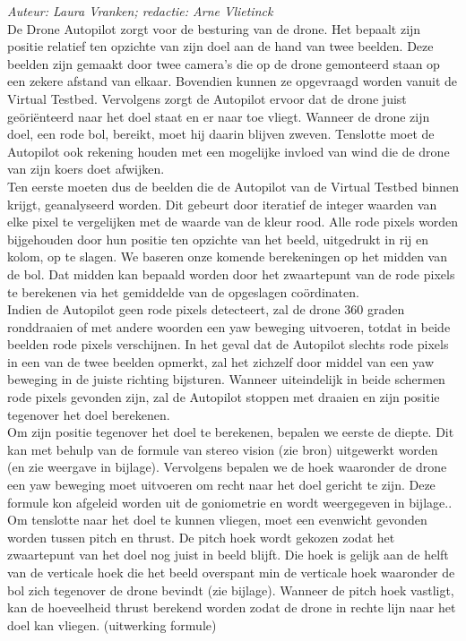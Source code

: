 {\em Auteur: Laura Vranken; redactie: Arne Vlietinck}\\

De Drone Autopilot zorgt voor de besturing van de drone. Het bepaalt zijn positie relatief ten opzichte van zijn doel aan de hand van twee beelden. Deze beelden zijn gemaakt door twee camera's die op de drone gemonteerd staan op een zekere afstand van elkaar. Bovendien kunnen ze opgevraagd worden vanuit de Virtual Testbed. Vervolgens zorgt de Autopilot ervoor dat de drone juist ge\"ori\"enteerd naar het doel staat en er naar toe vliegt. Wanneer de drone zijn doel,  een rode bol, bereikt, moet hij daarin blijven zweven. Tenslotte moet de Autopilot ook rekening houden met een mogelijke invloed van wind die de drone van zijn koers doet afwijken.\\

Ten eerste moeten dus de beelden die de Autopilot van de Virtual Testbed binnen krijgt, geanalyseerd worden. Dit gebeurt door iteratief de integer waarden van elke pixel te vergelijken met de waarde van de kleur rood. Alle rode pixels worden bijgehouden door hun positie ten opzichte van het beeld, uitgedrukt in rij en kolom, op te slagen. We baseren onze komende berekeningen op het midden van de bol. Dat midden kan bepaald worden door het zwaartepunt van de rode pixels te berekenen via het gemiddelde van de opgeslagen co\"ordinaten.\\

Indien de Autopilot geen rode pixels detecteert, zal de drone 360 graden ronddraaien of met andere woorden een yaw beweging uitvoeren, totdat in beide beelden rode pixels verschijnen. In het geval dat de Autopilot slechts rode pixels in een van de twee beelden opmerkt, zal het zichzelf door middel van een yaw beweging in de juiste richting bijsturen. Wanneer uiteindelijk in beide schermen rode pixels gevonden zijn, zal de Autopilot stoppen met draaien en zijn positie tegenover het doel berekenen.\\

Om zijn positie tegenover het doel te berekenen, bepalen we eerste de diepte. Dit kan met behulp van de formule van stereo vision (zie bron) uitgewerkt worden (en zie weergave in bijlage). Vervolgens bepalen we de hoek waaronder de drone een yaw beweging moet uitvoeren om recht naar het doel gericht te zijn. Deze formule kon afgeleid worden uit de goniometrie en wordt weergegeven in bijlage.. Om tenslotte naar het doel te kunnen vliegen, moet een evenwicht gevonden worden tussen pitch en thrust. De pitch hoek wordt gekozen zodat het zwaartepunt van het doel nog juist in beeld blijft. Die hoek is gelijk aan de helft van de verticale hoek die het beeld overspant min de verticale hoek waaronder de bol zich tegenover de drone bevindt (zie bijlage). Wanneer de pitch hoek vastligt, kan de hoeveelheid thrust berekend worden zodat de drone in rechte lijn naar het doel kan vliegen. (uitwerking formule)\\


